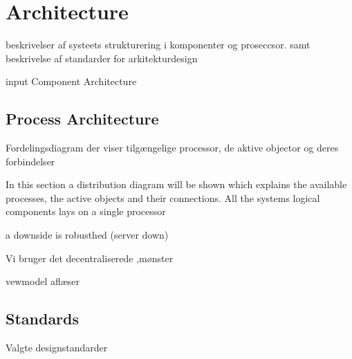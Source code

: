\chapter{Architecture}
beskrivelser af systeets strukturering i komponenter og proseccsor. samt beskrivelse af standarder for arkitekturdesign 

input Component Architecture

\section{Process Architecture}
Fordelingsdiagram der viser tilgængelige processor, de aktive objector og deres forbindelser 

In this section a distribution diagram will be shown which explains the available processes, the active objects and their connections.
All the systems logical components lays on a single processor 

a downside is robusthed (server down)

Vi bruger det decentraliserede ,mønster

vewmodel aflæser

\section{Standards}
Valgte designstandarder